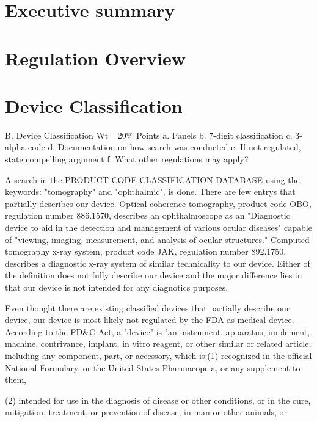 \documentclass{article}
\begin{document}

\setcounter{tocdepth}{3}
\tableofcontents
\newpage

\section*{Executive summary}
\label{sec:exec-summary}

\section{Regulation Overview}
\label{sec:test-administration}

\section{Device Classification}
\label{sec:protocols}
B. Device Classification Wt =20\% Points
a. Panels
b. 7-digit classification
c. 3-alpha code
d. Documentation on how search was conducted
e. If not regulated, state compelling argument
f. What other regulations may apply?

A search in the PRODUCT CODE CLASSIFICATION DATABASE using the
keywords: "tomography" and "ophthalmic", is done. There are few entrys
that partially describes our device. Optical coherence tomography,
product code OBO, regulation number 886.1570, describes an
ophthalmoscope as an "Diagnostic device to aid in the detection and
management of various ocular diseases" capable of "viewing, imaging,
measurement, and analysis of ocular structures."  Computed tomography
x-ray system, product code JAK, regulation number 892.1750, describes
a diagnostic x-ray system of similar technicality to our
device. Either of the definition does not fully describe our device
and the major difference lies in that our device is not intended for
any diagnotics purposes.

Even thought there are existing classified devices that partially
describe our device, our device is most likely not regulated by the
FDA as medical device. According to the FD\&C Act, a "device" is "an
instrument, apparatus, implement, machine, contrivance, implant, in
vitro reagent, or other similar or related article, including any
component, part, or accessory, which is:(1) recognized in the official
National Formulary, or the United States Pharmacopeia, or any
supplement to them,

(2) intended for use in the diagnosis of disease or other conditions,
or in the cure, mitigation, treatment, or prevention of disease, in
man or other animals, or
\end{document}
